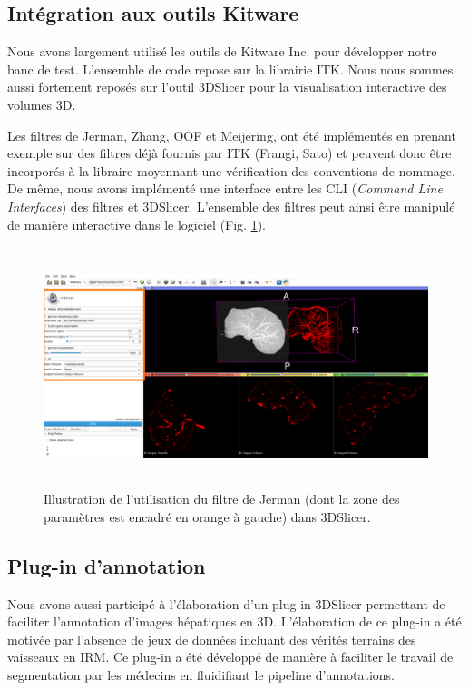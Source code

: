 \subsection{Intégration aux outils Kitware}

Nous avons largement utilisé les outils de Kitware Inc. pour développer notre banc de test. L'ensemble de code repose sur la librairie ITK. Nous nous sommes aussi fortement reposés sur l'outil 3DSlicer pour la visualisation interactive des volumes 3D.

Les filtres de Jerman, Zhang, OOF et Meijering, ont été implémentés en prenant exemple sur des filtres déjà fournis par ITK (Frangi, Sato) et peuvent donc être incorporés à la libraire moyennant une vérification des conventions de nommage. De même, nous avons implémenté une interface entre les CLI (\textit{Command Line Interfaces}) des filtres et 3DSlicer. L'ensemble des filtres peut ainsi être manipulé de manière interactive dans le logiciel (Fig. \ref{fig:slicer_vesselness}).

\begin{figure}[H]
    \includegraphics[height=7cm]{Images/slicer_jerman.png}
    \caption{Illustration de l'utilisation du filtre de Jerman (dont la zone des  paramètres est encadré en orange à gauche) dans 3DSlicer.}
    \label{fig:slicer_vesselness}
\end{figure}

\subsection{Plug-in d'annotation}

Nous avons aussi participé à l'élaboration d'un plug-in 3DSlicer permettant de faciliter l'annotation d'images hépatiques en 3D. L'élaboration de ce plug-in a été motivée par l'absence de jeux de données incluant des vérités terrains des vaisseaux en IRM. Ce plug-in a été développé de manière à faciliter le travail de segmentation par les médecins en fluidifiant le pipeline d'annotations.

